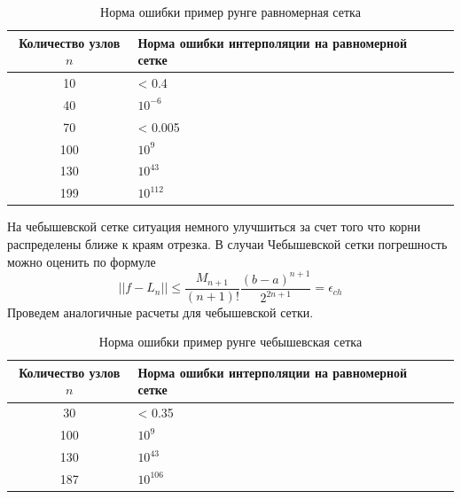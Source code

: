 \documentclass{article}
\begin{document}
\begin{enumerate}
\begin{table}[H]
        	\caption{Норма ошибки пример рунге равномерная сетка}
        	\begin{tabular}{|c|p{5cm}|p{5cm}|}
        		\hline
        		Количество узлов $n$ & Норма ошибки интерполяции
        		на равномерной сетке \\ \hline 
        		10 & < 0.4 \\ \hline 
        		40 & $10^{-6}$ \\ \hline 
        		70 & < 0.005 \\ \hline
        		100 & $10^9$ \\ \hline
        		130 & $10^{43}$ \\ \hline
        		199 & $10^{112}$\\ \hline
        	\end{tabular}
        \end{table}
        
        
        На чебышевской сетке ситуация немного улучшиться за счет того что корни распределены ближе к краям отрезка. В случаи Чебышевской сетки погрешность можно оценить по формуле
        \[
        ||f-L_n||\le \frac{M_{n+1}}{(n+1)!}\frac{(b-a)^{n+1}}{2^{2n+1}} = \epsilon_{ch}
        \]
		Проведем аналогичные расчеты для чебышевской сетки.
		
		\begin{table}[H]
			\centering
			\caption{Норма ошибки пример рунге чебышевская сетка}
			\begin{tabular}{|c|p{5cm}|p{5cm}|}
				\hline
				Количество узлов $n$ & Норма ошибки интерполяции
				на равномерной сетке \\ \hline 
				30 & < 0.35 \\ \hline 
				100 & $10^9$ \\ \hline
				130 & $10^{43}$ \\ \hline
				187 & $10^{106}$\\ \hline
			\end{tabular}
		\end{table}
		

\end{enumerate}
\end{document}
